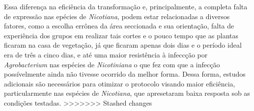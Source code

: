 Essa diferença na eficiência da transformação e, principalmente, a completa falta de expressão nas epécies de \textit{Nicotiana}, podem estar relacionadas a diversos fatores, como a escolha errônea da área seccionada e sua orientação, falta de experiência dos grupos em realizar tais cortes e o pouco tempo que as plantas ficaram na casa de vegetação, já que ficaram apenas dois dias e o período ideal era de três a cinco dias, e até uma maior resistência à infeccção por \textit{Agrobacterium} nas espécies de \textit{Nicotiniana} o que fez com que a infecção possívelmente ainda não tivesse ocorrido da melhor forma. Dessa forma, estudos adicionais são necessários para otimizar o protocolo visando maior eficiência, particularmente nas espécies de \textit{Nicotiana}, que apresetaram baixa resposta sob as condições testadas. 
>>>>>>> Stashed changes

